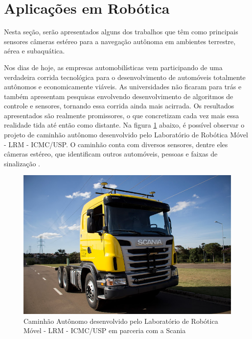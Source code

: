 \section{Aplicações em Robótica}

Nesta seção, serão apresentados alguns dos trabalhos que têm como principais sensores câmeras estéreo para a navegação autônoma em ambientes terrestre, aérea e subaquática.

Nos dias de hoje, as empresas automobilísticas vem participando de uma verdadeira corrida tecnológica para o desenvolvimento de automóveis totalmente autônomos e economicamente viáveis. As universidades não ficaram para trás e também apresentam pesquisas envolvendo desenvolvimento de algoritmos de controle e sensores, tornando essa corrida ainda mais acirrada. Os resultados apresentados são realmente promissores, o que concretizam cada vez mais essa realidade tida até então como distante. Na figura \ref{caminhao_autonomo} abaixo, é possível observar o projeto de caminhão autônomo desenvolvido pelo Laboratório de Robótica Móvel - LRM - ICMC/USP. O caminhão conta com diversos sensores, dentre eles câmeras estéreo, que identificam outros automóveis, pessoas e faixas de sinalização \cite{ShinzatoP}. 

\begin{figure}[H]
 	\centering
 	\includegraphics[scale=0.35]{./Resources/caminhao_autonomo.jpg}
 	\caption{Caminhão Autônomo desenvolvido pelo Laboratório de Robótica Móvel - LRM - ICMC/USP em parceria com a Scania}
 	\label{caminhao_autonomo}
\end{figure}

